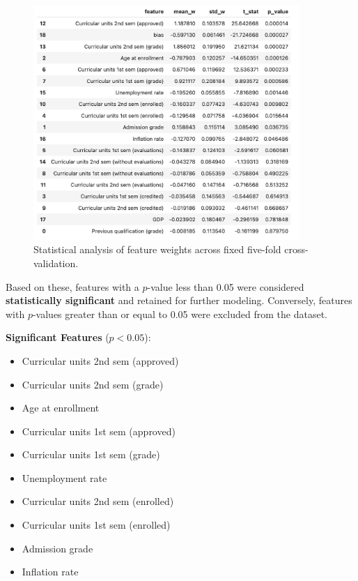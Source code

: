 \documentclass[12pt]{article}
\begin{document}
\begin{figure}[H]
    \centering
    \includegraphics[width=0.9\textwidth]{./statistical-analysis-of-ordinal-features.png}
    \caption{Statistical analysis of feature weights across fixed five-fold cross-validation.}
    \label{fig:stats}
\end{figure}

Based on these, features with a $p$-value less than 0.05 were considered \textbf{statistically significant} and retained for further modeling. Conversely, features with $p$-values greater than or equal to 0.05 were excluded from the dataset.

\textbf{Significant Features} ($p < 0.05$):
\begin{itemize}
  \item Curricular units 2nd sem (approved)
    \item Curricular units 2nd sem (grade)
    \item Age at enrollment
    \item Curricular units 1st sem (approved)
    \item Curricular units 1st sem (grade)
    \item Unemployment rate
    \item Curricular units 2nd sem (enrolled)
    \item Curricular units 1st sem (enrolled)
    \item Admission grade
    \item Inflation rate
\end{itemize}
\end{document}
